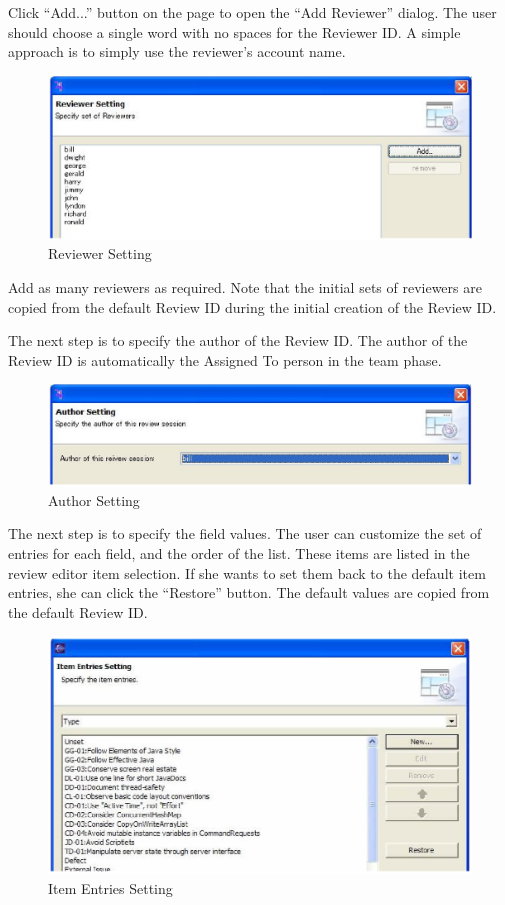 Click ``Add...'' button on the page to open the ``Add Reviewer'' dialog. The user should choose a single word with no spaces for the Reviewer ID. A simple approach is to simply use the reviewer's account name. 

\begin{figure}[htbp]
  \centering
  \includegraphics{images/fig3-6.eps}
  \caption{Reviewer Setting}
  \label{fig3-6}
\end{figure}

Add as many reviewers as required. Note that the initial sets of reviewers are copied from the default Review ID during the initial creation of the Review ID.

The next step is to specify the author of the Review ID. The author of the Review ID is automatically the Assigned To person in the team phase.

\begin{figure}[htbp]
  \centering
  \includegraphics{images/fig3-7.eps}
  \caption{Author Setting}
  \label{fig3-7}
\end{figure}

The next step is to specify the field values. The user can customize the set of entries for each field, and the order of the list. These items are listed in the review editor item selection. If she wants to set them back to the default item entries, she can click the ``Restore'' button. The default values are copied from the default Review ID.

\begin{figure}[htbp]
  \centering
  \includegraphics{images/fig3-8.eps}
  \caption{Item Entries Setting}
  \label{fig3-8}
\end{figure}

